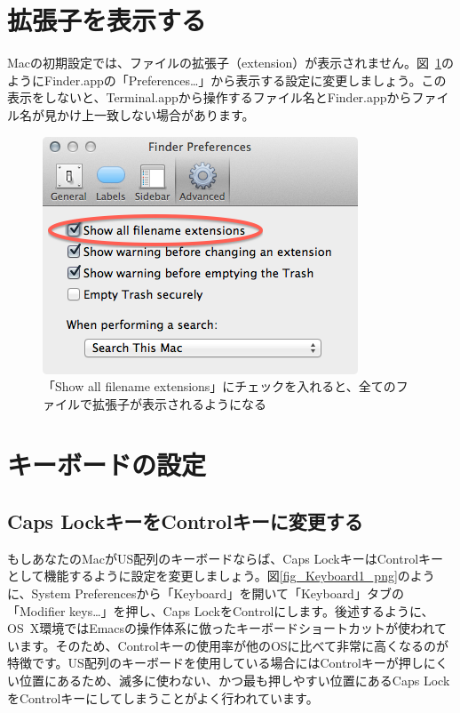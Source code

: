 \section{拡張子を表示する}
Macの初期設定では、ファイルの拡張子（extension）が表示されません。図~\ref{fig_Extension_png}のようにFinder.appの「Preferences\ldots」から表示する設定に変更しましょう。この表示をしないと、Terminal.appから操作するファイル名とFinder.appからファイル名が見かけ上一致しない場合があります。

\begin{figure}
  \centering
  \includegraphics[scale=0.35]{fig/Extension.png}
  \caption{「Show all filename extensions」にチェックを入れると、全てのファイルで拡張子が表示されるようになる}
  \label{fig_Extension_png}
\end{figure}

\section{キーボードの設定}

\subsection{Caps LockキーをControlキーに変更する}
もしあなたのMacがUS配列のキーボードならば、Caps LockキーはControlキーとして機能するように設定を変更しましょう。図\ref{fig_Keyboard1_png}のように、System Preferencesから「Keyboard」を開いて「Keyboard」タブの「Modifier keys\ldots」を押し、Caps LockをControlにします。後述するように、OS~X環境ではEmacsの操作体系に倣ったキーボードショートカットが使われています。そのため、Controlキーの使用率が他のOSに比べて非常に高くなるのが特徴です。US配列のキーボードを使用している場合にはControlキーが押しにくい位置にあるため、滅多に使わない、かつ最も押しやすい位置にあるCaps LockをControlキーにしてしまうことがよく行われています。

